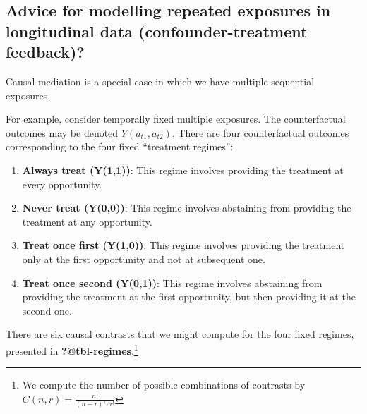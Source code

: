 \documentclass[
  singlecolumn]{report}
\begin{document}
\hypertarget{advice-for-modelling-repeated-exposures-in-longitudinal-data-confounder-treatment-feedback}{%
\subsection{Advice for modelling repeated exposures in longitudinal data
(confounder-treatment
feedback)?}\label{advice-for-modelling-repeated-exposures-in-longitudinal-data-confounder-treatment-feedback}}

Causal mediation is a special case in which we have multiple sequential
exposures.

For example, consider temporally fixed multiple exposures. The
counterfactual outcomes may be denoted \(Y(a_{t1} ,a_{t2})\). There are
four counterfactual outcomes corresponding to the four fixed ``treatment
regimes'':

\begin{enumerate}
\def\labelenumi{\arabic{enumi}.}
\item
  \textbf{Always treat (Y(1,1))}: This regime involves providing the
  treatment at every opportunity.
\item
  \textbf{Never treat (Y(0,0))}: This regime involves abstaining from
  providing the treatment at any opportunity.
\item
  \textbf{Treat once first (Y(1,0))}: This regime involves providing the
  treatment only at the first opportunity and not at subsequent one.
\item
  \textbf{Treat once second (Y(0,1))}: This regime involves abstaining
  from providing the treatment at the first opportunity, but then
  providing it at the second one.
\end{enumerate}

There are six causal contrasts that we might compute for the four fixed
regimes, presented in \textbf{?@tbl-regimes}.\footnote{We compute the
  number of possible combinations of contrasts by
  \(C(n, r) = \frac{n!}{(n-r)! \cdot r!}\)}
\end{document}

